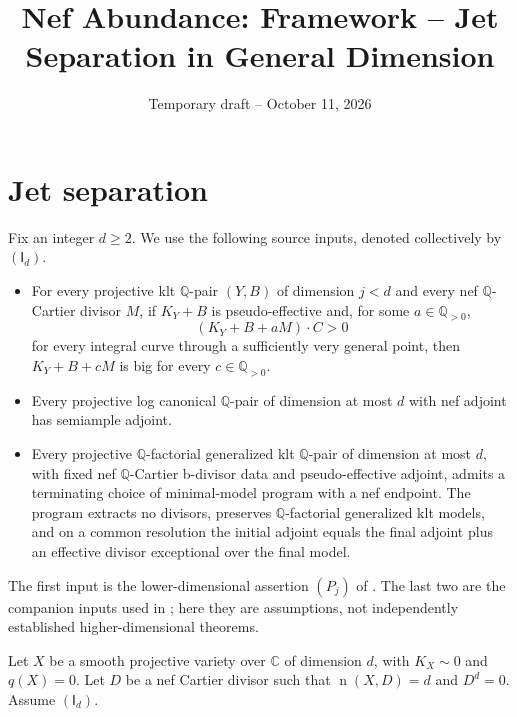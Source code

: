 \documentclass[12pt,a4paper,psamsfonts]{amsart}
\title{Nef Abundance: Framework -- Jet Separation in General Dimension}
\date{Temporary draft -- October 11, 2026}
\theoremstyle{definition}
\theoremstyle{plain}
\newcommand{\Q}{\mathbb Q}
\newcommand{\C}{\mathbb C}
\newcommand{\nef}{\operatorname{n}}
\begin{document}
\maketitle

\section{Jet separation}

Fix an integer $d\ge2$. We use the following source inputs,
denoted collectively by $(\mathsf I_d)$.
\begin{itemize}
\setlength{\itemsep}{2pt}
\setlength{\parsep}{0pt}
\item For every projective klt $\Q$-pair $(Y,B)$ of dimension
$j<d$ and every nef $\mathbb{Q}$-Cartier divisor $M$, if $K_Y+B$ is
pseudo-effective and, for some $a\in\Q_{>0}$,
\[
 (K_Y+B+aM)\cdot C>0
\]
for every integral curve through a sufficiently very general point,
then $K_Y+B+cM$ is big for every $c\in\Q_{>0}$.
\item Every projective log canonical $\Q$-pair of dimension at most
$d$ with nef adjoint has semiample adjoint.
\item Every projective $\Q$-factorial generalized klt $\Q$-pair of
dimension at most $d$, with fixed nef $\mathbb{Q}$-Cartier b-divisor
data and pseudo-effective adjoint, admits a terminating choice of
minimal-model program with a nef endpoint. The program extracts no
divisors, preserves $\Q$-factorial generalized klt models, and on a
common resolution the initial adjoint equals the final adjoint plus
an effective divisor exceptional over the final model.
\end{itemize}
The first input is the lower-dimensional assertion $(P_j)$ of
\cite[Section~3.1]{NS}. The last two are the companion inputs
used in \cite[Section~2]{NS}; here they are assumptions, not
independently established higher-dimensional theorems.

Let $X$ be a smooth projective variety over $\C$ of dimension $d$,
with $K_X\sim0$ and $q(X)=0$. Let $D$ be a nef Cartier divisor
such that $\nef(X,D)=d$ and $D^d=0$. Assume $(\mathsf I_d)$.
\end{document}
